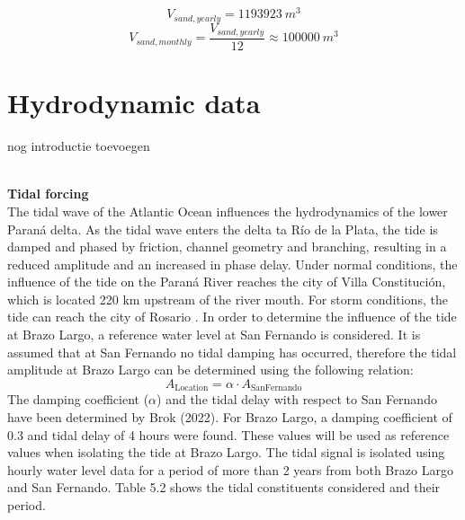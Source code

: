 \begin{equation}
    V_{sand,yearly} = 1193923 ~m^3
\end{equation}
\begin{equation}
    V_{sand,monthly} = \frac{V_{sand,yearly}}{12} \approx 100000 ~m^3 
\end{equation}


\section{Hydrodynamic data}
nog introductie toevoegen

\\ \textbf{Tidal forcing}
\\The tidal wave of the Atlantic Ocean influences the hydrodynamics of the lower Paraná delta. As the tidal wave enters the delta ta Río de la Plata, the tide is damped and phased by friction, channel geometry and branching, resulting in a reduced amplitude and an increased in phase delay. Under normal conditions, the influence of the tide on the Paraná River reaches the city of Villa Constitución, which is located 220 km upstream of the river mouth. For storm conditions, the tide can reach the city of Rosario \autocite{balayCAUSESPERIODICITYLARGE}. In order to determine the influence of the tide at Brazo Largo, a reference water level at San Fernando is considered. It is assumed that at San Fernando no tidal damping has occurred, therefore the tidal amplitude at Brazo Largo can be determined using the following relation:
\[
A_{\text{Location}} = \alpha \cdot A_{\text{SanFernando}}
\]
The damping coefficient ($\alpha$) and the tidal delay with respect to San Fernando have been determined by Brok (2022). For Brazo Largo, a damping coefficient of 0.3 and tidal delay of 4 hours were found. These values will be used as reference values when isolating the tide at Brazo Largo. The tidal signal is isolated using hourly water level data for a period of more than 2 years from both Brazo Largo and San Fernando. Table 5.2 shows the tidal constituents  considered and their period.

